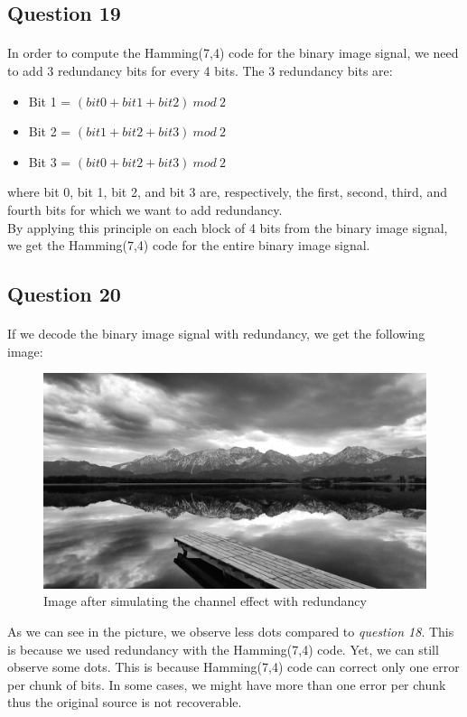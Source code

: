 \documentclass[a4paper, 11pt, oneside]{article}
\begin{document}

\subsection{Question 19}
\paragraph{}In order to compute the Hamming(7,4) code for the binary image signal, we need to add 3 redundancy bits for every 4 bits. The 3 redundancy bits are:
\begin{itemize}
    \item Bit 1 = $(bit 0 + bit 1 + bit 2) \ mod \ 2$
    \item Bit 2 = $(bit 1 + bit 2 + bit 3) \ mod \ 2$
    \item Bit 3 = $(bit 0 + bit 2 + bit 3) \ mod \ 2$
\end{itemize}
where bit 0, bit 1, bit 2, and bit 3 are, respectively, the first, second, third, and fourth bits for which we want to add redundancy.\\
By applying this principle on each block of 4 bits from the binary image signal, we get the Hamming(7,4) code for the entire binary image signal.


\subsection{Question 20}
\paragraph{}If we decode the binary image signal with redundancy, we get the following image:
\begin{figure}[H]
    \centering
    \includegraphics[scale=0.2]{q20.png}
    \caption{Image after simulating the channel effect with redundancy}
\end{figure}
As we can see in the picture, we observe less dots compared to \textit{question 18}. This is because we used redundancy with the Hamming(7,4) code.
Yet, we can still observe some dots. This is because Hamming(7,4) code can correct only one error per chunk of bits. In some cases, we might have more
than one error per chunk thus the original source is not recoverable.
\end{document}
